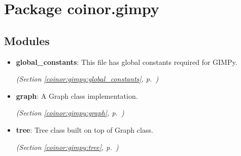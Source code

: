 %
%
%


\section{Package coinor.gimpy}

    \label{coinor:gimpy}


\subsection{Modules}

\begin{itemize}
\setlength{\parskip}{0ex}
\item \textbf{global\_constants}: This file has global constants required for GIMPy.



  \textit{(Section \ref{coinor:gimpy:global_constants}, p.~\pageref{coinor:gimpy:global_constants})}

\item \textbf{graph}: 
A Graph class implementation. 


  \textit{(Section \ref{coinor:gimpy:graph}, p.~\pageref{coinor:gimpy:graph})}

\item \textbf{tree}: Tree class built on top of Graph class.



  \textit{(Section \ref{coinor:gimpy:tree}, p.~\pageref{coinor:gimpy:tree})}

\end{itemize}



